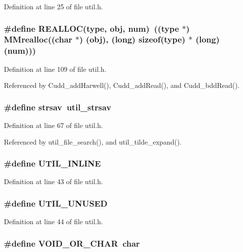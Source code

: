 Definition at line 25 of file util.h.
\subsubsection{\setlength{\rightskip}{0pt plus 5cm}\#define REALLOC(type, obj, num)~((type $\ast$) MMrealloc((char $\ast$) (obj), (long) sizeof(type) $\ast$ (long) (num)))}\label{util_8h_c3d02b1026db1997f09067d47aed16a8}




Definition at line 109 of file util.h.

Referenced by Cudd\_\-add\-Harwell(), Cudd\_\-add\-Read(), and Cudd\_\-bdd\-Read().
\subsubsection{\setlength{\rightskip}{0pt plus 5cm}\#define strsav~util\_\-strsav}\label{util_8h_ed0348fcfd6ce9ab80a01d192c91fc82}




Definition at line 67 of file util.h.

Referenced by util\_\-file\_\-search(), and util\_\-tilde\_\-expand().
\subsubsection{\setlength{\rightskip}{0pt plus 5cm}\#define UTIL\_\-INLINE}\label{util_8h_3f9a7db4d2d7bcc67c240b46c633493a}




Definition at line 43 of file util.h.
\subsubsection{\setlength{\rightskip}{0pt plus 5cm}\#define UTIL\_\-UNUSED}\label{util_8h_87240b9a8c602f39bcbe0246c9e6ec42}




Definition at line 44 of file util.h.
\subsubsection{\setlength{\rightskip}{0pt plus 5cm}\#define VOID\_\-OR\_\-CHAR~char}\label{util_8h_97ba5606b96ef10cee313ae47ece8674}




